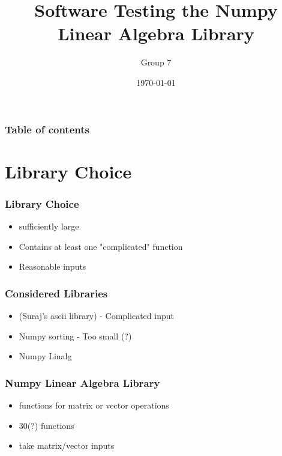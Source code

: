 \documentclass{beamer}
\begin{document}
\title{Software Testing the Numpy Linear Algebra Library}  
\author{Group 7}

\date{\today} 
\begin{frame}
\titlepage
\end{frame}

\begin{frame}\frametitle{Table of contents}\tableofcontents
\end{frame} 

\section{Library Choice}
\begin{frame}
\frametitle{Library Choice} 
\begin{itemize}
\item sufficiently large\\
\item Contains at least one "complicated" function\\
\item Reasonable inputs \\
\end{itemize}
\end{frame}

\begin{frame}\frametitle{Considered Libraries} 
\begin{itemize}
\item (Suraj's ascii library) - Complicated input 
\item Numpy sorting - Too small (?)
\item Numpy Linalg 
\end{itemize}
\end{frame}


\begin{frame}\frametitle{Numpy Linear Algebra Library} 
\begin{itemize}

\item functions for matrix or vector operations 
\item 30(?) functions
\item take matrix/vector inputs 
\end{itemize}
\end{frame}
\end{document}
